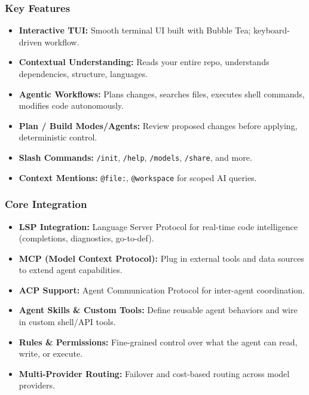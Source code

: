 \begin{frame}[fragile]\frametitle{Key Features}
  \begin{itemize}
    \item \textbf{Interactive TUI:} Smooth terminal UI built with Bubble Tea; keyboard-driven workflow.
    \item \textbf{Contextual Understanding:} Reads your entire repo, understands dependencies, structure, languages.
    \item \textbf{Agentic Workflows:} Plans changes, searches files, executes shell commands, modifies code autonomously.
    \item \textbf{Plan / Build Modes/Agents:} Review proposed changes before applying,  deterministic control.
    \item \textbf{Slash Commands:} \texttt{/init}, \texttt{/help}, \texttt{/models}, \texttt{/share}, and more.
    \item \textbf{Context Mentions:} \texttt{@file:}, \texttt{@workspace} for scoped AI queries.
  \end{itemize}
\end{frame}

\begin{frame}[fragile]\frametitle{Core Integration}
  \begin{itemize}
    \item \textbf{LSP Integration:} Language Server Protocol for real-time code intelligence (completions, diagnostics, go-to-def).
    \item \textbf{MCP (Model Context Protocol):} Plug in external tools and data sources to extend agent capabilities.
    \item \textbf{ACP Support:} Agent Communication Protocol for inter-agent coordination.
    \item \textbf{Agent Skills \& Custom Tools:} Define reusable agent behaviors and wire in custom shell/API tools.
    \item \textbf{Rules \& Permissions:} Fine-grained control over what the agent can read, write, or execute.
    \item \textbf{Multi-Provider Routing:} Failover and cost-based routing across model providers.
  \end{itemize}
\end{frame}



